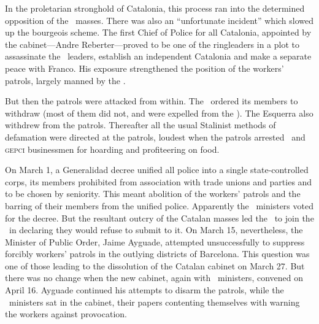In the proletarian stronghold of Catalonia, this process ran into the determined opposition of the \CNT\ masses. There was also an ``unfortunate incident'' which slowed up the bourgeois scheme. The first Chief of Police for all Catalonia, appointed by the cabinet---Andre Reberter---proved to be one of the ringleaders in a plot to assassinate the \CNT\ leaders, establish an independent Catalonia and make a separate peace with Franco. His exposure strengthened the position of the workers’ patrols, largely manned by the \CNT.

But then the patrols were attacked from within. The \PSUC\ ordered its members to withdraw (most of them did not, and were expelled from the \PSUC). The Esquerra also withdrew from the patrols. Thereafter all the usual Stalinist methods of defamation were directed at the patrols, loudest when the patrols arrested \PSUC\ and \textsc{gepci} businessmen for hoarding and profiteering on food.

On March 1, a Generalidad decree unified all police into a single state-controlled corps, its members prohibited from association with trade unions and parties and to be chosen by seniority. This meant abolition of the workers’ patrols and the barring of their members from the unified police. Apparently the \CNT\ ministers voted for the decree. But the resultant outcry of the Catalan masses led the \CNT\ to join the \POUM\ in declaring they would refuse to submit to it. On March 15, nevertheless, the Minister of Public Order, Jaime Ayguade, attempted unsuccessfully to suppress forcibly workers’ patrols in the outlying districts of Barcelona. This question was one of those leading to the dissolution of the Catalan cabinet on March 27. But there was no change when the new cabinet, again with \CNT\ ministers, convened on April 16. Ayguade continued his attempts to disarm the patrols, while the \CNT\ ministers sat in the cabinet, their papers contenting themselves with warning the workers against provocation.

